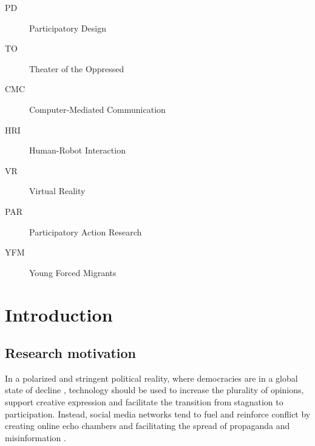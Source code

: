 \documentclass[dissertation,math,vertlayout,pdfa,colorlinks,nologo]{aaltoseries}
\begin{document}
\clearpage
\tableofcontents


\listofpublications

\listoffigures
\listoftables


\abbreviations

\begin{description}
\item[PD] Participatory Design
\item[TO] Theater of the Oppressed
\item[CMC] Computer-Mediated Communication
\item[HRI] Human-Robot Interaction
\item[VR] Virtual Reality
\item[PAR] Participatory Action Research
\item[YFM] Young Forced Migrants
\end{description}


\chapter{Introduction}
\section{Research motivation}
In a polarized and stringent political reality, where democracies are in a global state of decline \cite{nordDemocracyReport20252025}, technology should be used to increase the plurality of opinions, support creative expression and facilitate the transition from stagnation to participation. Instead, social media networks tend to fuel and reinforce conflict by creating online echo chambers and facilitating the spread of propaganda and misinformation \cite{xingDivingDivideSystematic2024}.
\end{document}
